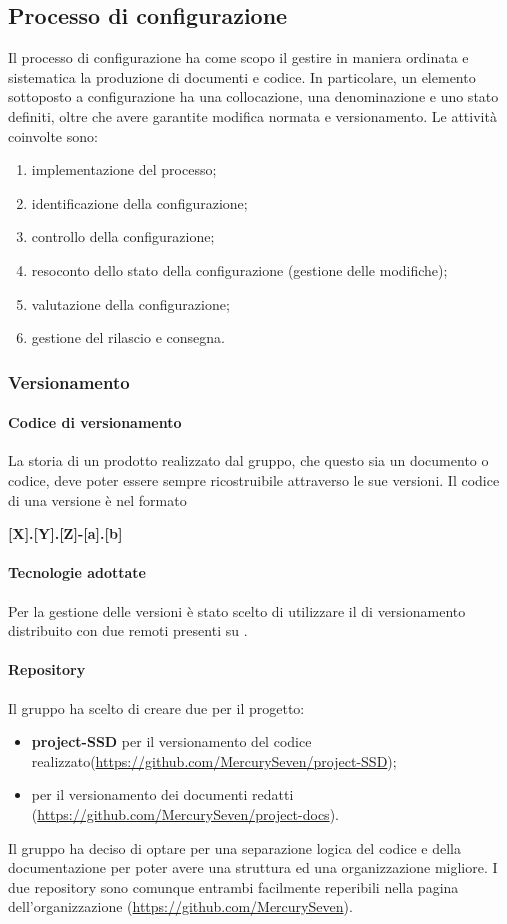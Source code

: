 {{\subsection{Processo di configurazione}
Il processo di configurazione ha come scopo il gestire in maniera ordinata e sistematica la produzione di documenti e codice. In particolare, un elemento sottoposto a configurazione ha una collocazione, una denominazione e uno stato definiti, oltre che avere garantite modifica normata e versionamento. Le attività coinvolte sono:
\begin{enumerate}
	\item implementazione del processo;
	\item identificazione della configurazione;
	\item controllo della configurazione;
	\item resoconto dello stato della configurazione (gestione delle modifiche);
	\item valutazione della configurazione;
	\item gestione del rilascio e consegna.
\end{enumerate}
\subsubsection{Versionamento}
\paragraph*{Codice di versionamento}
\label{cod-versionamento}
La storia di un prodotto realizzato dal gruppo, che questo sia un documento o codice, deve poter essere sempre ricostruibile attraverso le sue versioni. Il codice di una versione è nel formato\newline
\centerline{\textbf{[X].[Y].[Z]-[a].[b]}}\newline
\paragraph*{Tecnologie adottate}
Per la gestione delle versioni è stato scelto di utilizzare il  di versionamento distribuito \textit{} con due  remoti presenti su \textit{}.
\paragraph*{Repository}
Il gruppo \textit{\Gruppo{}} ha scelto di creare due  per il progetto:
\begin{itemize}
	\item \textbf{project-SSD} per il versionamento del codice realizzato(\url{https://github.com/MercurySeven/project-SSD});
	\item \textbf{\repoDoc{}} per il versionamento dei documenti redatti (\url{https://github.com/MercurySeven/project-docs}).
\end{itemize}
Il gruppo ha deciso di optare per una separazione logica del codice e della documentazione per poter avere una struttura ed una organizzazione migliore. I due repository sono comunque entrambi facilmente reperibili nella pagina dell'organizzazione (\url{https://github.com/MercurySeven}).
}}
